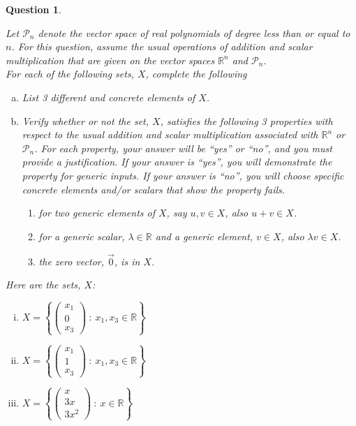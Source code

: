 \documentclass[12pt]{article}
\newtheorem{question}[thm]{Question}
\def\real{{\mathbb R}}
\def\lam{\lambda}
\def\P{\mathcal P}
\newcommand{\ColVecThree}[3]{\begin{pmatrix} #1\\ #2\\ #3\end{pmatrix}}
\begin{document}
\vspace{0.4cm}



\begin{question}\label{que:VectSpaceAxioms}
	\normalfont
	
	Let $\P_n$ denote the vector space of real polynomials of degree less than or equal to $n$. For this question, assume the usual operations of addition and scalar multiplication that are given on the vector spaces $\real^n$ and $\P_n$. \\
	
	For each of the following sets, $X$, complete the following
	\begin{enumerate}[(a)]
		
		\item List 3 different and concrete elements of $X$.
		
		\item Verify whether or not the set, $X$, satisfies the following 3 properties with respect to the usual addition and scalar multiplication associated with $\real^n$ or $\P_n$.  For each property, your answer will be ``yes'' or ``no'', and you must provide a justification.  If your answer is ``yes'', you will demonstrate the property for generic inputs.  If your answer is ``no'', you will choose specific concrete elements and/or scalars that show the property fails.
		
		\begin{enumerate}[(1)]
			\item for two generic elements of $X$, say $u,v\in X$, also $u+v\in X$.
			\item for a generic scalar, $\lam\in\real$ and a generic element, $v\in X$, also $\lam v\in X$.
			\item the zero vector, $\vec{0}$, is in $X$.
		\end{enumerate}
		
	\end{enumerate}
	
	
	Here are the sets, $X$:
	\begin{enumerate}[(i)]
		\item $\displaystyle X = \left\{  \ColVecThree{x_1}{0}{x_3}\ :\ x_1,x_3\in\real  \right\}$
		
		\item $\displaystyle X = \left\{  \ColVecThree{x_1}{1}{x_3}\ :\ x_1,x_3\in\real  \right\}$
		
		\item $\displaystyle X = \left\{  \ColVecThree{x}{3x}{3x^2}\ :\ x\in\real  \right\}$
		

\end{enumerate}
\end{question}
\end{document}
